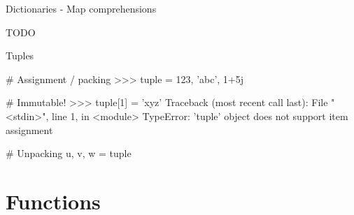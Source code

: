 \documentclass[10pt]{beamer}
\begin{document}

\begin{frame}[fragile]{Dictionaries - Map comprehensions}

    TODO

\end{frame}


\begin{frame}[fragile]{Tuples}

    \begin{pythoncode}
        # Assignment / packing
        >>> tuple = 123, 'abc', 1+5j
    \end{pythoncode}

    \pause

    \begin{pythoncode}
        # Immutable!
        >>> tuple[1] = 'xyz'
        Traceback (most recent call last):
          File "<stdin>", line 1, in <module>
        TypeError: 'tuple' object does not support item assignment
    \end{pythoncode}

    \pause

    \begin{pythoncode}
        # Unpacking
        u, v, w = tuple
    \end{pythoncode}

\end{frame}


\section{Functions}

\end{document}
